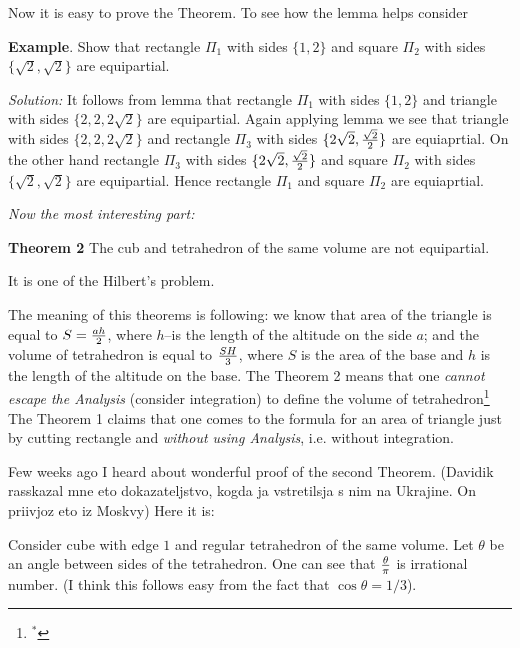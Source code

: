 \m
 Now it is easy to prove the Theorem. To see how the lemma helps consider


{\bf Example}. Show that rectangle $\Pi_1$ with sides $\{1,2\}$ and square $\Pi_2$ with sides
$\{\sqrt 2, \sqrt 2\}$ are equipartial.

{\it Solution:}  It follows from lemma that rectangle  $\Pi_1$ with sides $\{1,2\}$ and triangle
  with sides $\{2,2,2\sqrt 2\}$ are equipartial. Again applying lemma we see that triangle
  with sides $\{2,2,2\sqrt 2\}$ and rectangle $\Pi_3$ with sides  $\{2\sqrt 2,{\sqrt 2\over 2}\}$
  are equiaprtial. On the other hand rectangle $\Pi_3$ with sides  $\{2\sqrt 2,{\sqrt 2\over 2}\}$
  and square  $\Pi_2$ with sides $\{\sqrt 2, \sqrt 2\}$ are equipartial. Hence rectangle $\Pi_1$
  and square $\Pi_2$ are equiaprtial.





  \bigskip

{\it Now the most interesting part:}

\bigskip

   {\bf Theorem 2} The cub and tetrahedron of the same volume are not equipartial.

  It is one of the Hilbert's problem.

  The meaning of this theorems is following:  we know that area of the triangle is equal to
  $S={ah\over 2}$,
  where $h$--is the length of the altitude on the side $a$; and  the volume  of tetrahedron
   is equal to ${SH\over 3}$,
   where $S$ is the area of the base and
    $h$ is the length of the altitude on the base.
  The Theorem 2  means that one {\it cannot escape the Analysis} (consider integration) to define
  the volume of tetrahedron\footnote{$^*$}
 {The Theorem 1 claims that one comes to the formula for an area of triangle
 just by cutting rectangle
 and {\it without using Analysis}, i.e. without integration}.



   Few weeks ago I heard about wonderful proof of the second Theorem.
   (Davidik rasskazal mne eto dokazateljstvo, kogda ja vstretilsja s nim na Ukrajine.
   On priivjoz eto iz Moskvy)
    Here it is:

\m


  Consider cube with edge $1$ and regular tetrahedron of the same volume.
  Let $\theta$  be an angle between sides of the tetrahedron.
  One can see that $\theta\over \pi$ is irrational number.
(I think this follows easy from the fact that $\cos \theta=1/3$).

